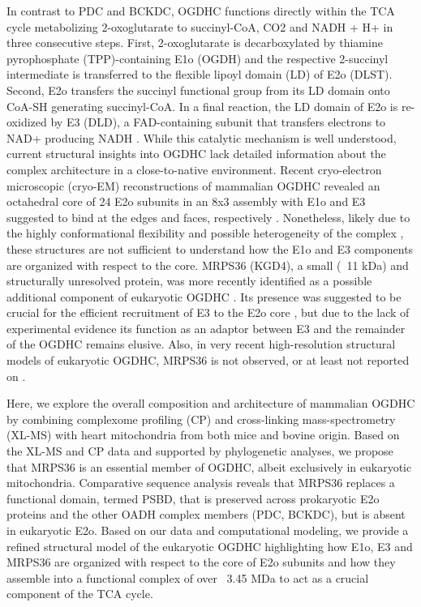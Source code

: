 In contrast to PDC and BCKDC, OGDHC functions directly within the TCA cycle metabolizing 2-oxoglutarate to succinyl-CoA, CO2 and NADH + H+ in three consecutive steps. First, 2-oxoglutarate is decarboxylated by thiamine pyrophosphate (TPP)-containing E1o (OGDH) and the respective 2-succinyl intermediate is transferred to the flexible lipoyl domain (LD) of E2o (DLST). Second, E2o transfers the succinyl functional group from its LD domain onto CoA-SH generating succinyl-CoA. In a final reaction, the LD domain of E2o is re-oxidized by E3 (DLD), a FAD-containing subunit that transfers electrons to NAD+ producing NADH \cite{Kyrilis_2021,Qi_2011}. While this catalytic mechanism is well understood, current structural insights into OGDHC lack detailed information about the complex architecture \cite{Frank_2007,Knapp_1998,Ricaud_1996,Robien_1992} in a close-to-native environment. Recent cryo-electron microscopic (cryo-EM) reconstructions of mammalian OGDHC revealed an octahedral core of 24 E2o subunits in an 8x3 assembly with E1o and E3 suggested to bind at the edges and faces, respectively \cite{Liu_2022,Nagy_2021}. Nonetheless, likely due to the highly conformational flexibility and possible heterogeneity of the complex \cite{Lengyel_2008}, these structures are not sufficient to understand how the E1o and E3 components are organized with respect to the core. MRPS36 (KGD4), a small (~11 kDa) and structurally unresolved protein, was more recently identified as a possible additional component of eukaryotic OGDHC \cite{Chatzispyrou_2018,Guerrero-Castillo_2021,Heublein_2014}. Its presence was suggested to be crucial for the efficient recruitment of E3 to the E2o core \cite{Heublein_2014}, but due to the lack of experimental evidence its function as an adaptor between E3 and the remainder of the OGDHC remains elusive. Also, in very recent high-resolution structural models of eukaryotic OGDHC, MRPS36 is not observed, or at least not reported on \cite{Liu_2022,Nagy_2021}.

Here, we explore the overall composition and architecture of mammalian OGDHC by combining complexome profiling (CP) \cite{Cabrera-Orefice_2021,Hevler_2021a} and cross-linking mass-spectrometry (XL-MS) with heart mitochondria from both mice and bovine origin. Based on the XL-MS and CP data and supported by phylogenetic analyses, we propose that MRPS36 is an essential member of OGDHC, albeit exclusively in eukaryotic mitochondria. Comparative sequence analysis reveals that MRPS36 replaces a functional domain, termed PSBD, that is preserved across prokaryotic E2o proteins and the other OADH complex members (PDC, BCKDC), but is absent in eukaryotic E2o. Based on our data and computational modeling, we provide a refined structural model of the eukaryotic OGDHC highlighting how E1o, E3 and MRPS36 are organized with respect to the core of E2o subunits and how they assemble into a functional complex of over ~3.45 MDa to act as a crucial component of the TCA cycle.
%
